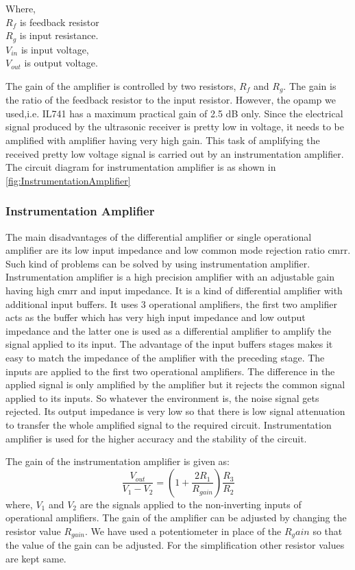 Where,\\ $R_f$ is feedback resistor \\$R_g$ is input resistance. \\$V_{in}$ is input voltage, \\$V_{out}$ is output voltage. 

The gain of the amplifier is controlled by two resistors, $R_f$ and $R_g$. The gain is the ratio of the feedback resistor to the input resistor. However, the opamp we used,i.e. IL741 has a maximum practical gain of 2.5 dB only. Since the electrical signal produced by the ultrasonic receiver is pretty low in voltage, it needs to be amplified with amplifier having very high gain. This task of amplifying the received pretty low voltage signal is carried out by an instrumentation amplifier. The circuit diagram for instrumentation amplifier is as shown in \ref{fig:InstrumentationAmplifier}

\subsubsection{Instrumentation Amplifier}
The main disadvantages of the differential amplifier or single operational amplifier are its low input impedance and low common mode rejection ratio \gls{cmrr}.  Such kind of problems can be solved by using instrumentation amplifier. Instrumentation amplifier is a high precision amplifier with an adjustable gain having high \gls{cmrr} and input impedance. It is a kind of differential amplifier with additional input buffers. It uses 3 operational amplifiers, the first two amplifier acts as the buffer which has very high input impedance and low output impedance and the latter one is used as a differential amplifier to amplify the signal applied to its input. The advantage of the input buffers stages makes it easy to match the impedance of the amplifier with the preceding stage. The inputs are applied to the first two operational amplifiers. The difference in the applied signal is only amplified by the amplifier but it rejects the common signal applied to its inputs. So whatever the environment is, the noise signal gets rejected. Its output impedance is very low so that there is low signal attenuation to transfer the whole amplified signal to the required circuit. Instrumentation amplifier is used for the higher accuracy and the stability of the circuit.



The gain of the instrumentation amplifier is given as:
\begin{equation}
	\frac{V_{out}}{V_1-V_2}=(1+\frac{2R_1}{R_{gain}})\frac{R_3}{R_2}
\end{equation}
where, $V_1$ and $V_2$ are the signals applied to the non-inverting inputs of operational amplifiers. The gain of the amplifier can be adjusted by changing the resistor value $R_{gain}$. We have used a potentiometer in place of the $R_gain$ so that the value of the gain can be adjusted. For the simplification other resistor values are kept same. 

